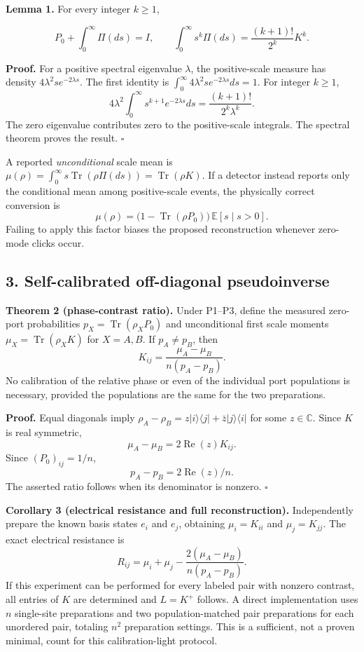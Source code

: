 \documentclass[
  10pt,
  a4paper,
]{article}
\begin{document}
\textbf{Lemma 1.} For every integer \(k\geq1\),

\[
P_0+\int_0^\infty\Pi(ds)=I,\qquad
\int_0^\infty s^k\Pi(ds)=\frac{(k+1)!}{2^k}K^k.
\]

\textbf{Proof.} For a positive spectral eigenvalue \(\lambda\), the positive-scale measure has density \(4\lambda^2s e^{-2\lambda s}\). The first identity is \(\int_0^\infty4\lambda^2s e^{-2\lambda s}ds=1\). For integer \(k\geq1\), \[
4\lambda^2\int_0^\infty s^{k+1}e^{-2\lambda s}ds
=\frac{(k+1)!}{2^k\lambda^k}.
\] The zero eigenvalue contributes zero to the positive-scale integrals. The spectral theorem proves the result. \(\square\)

A reported \emph{unconditional} scale mean is \(\mu(\rho)=\int_0^\infty s\operatorname{Tr}(\rho\Pi(ds))=\operatorname{Tr}(\rho K)\). If a detector instead reports only the conditional mean among positive-scale events, the physically correct conversion is \[
\mu(\rho)=\bigl(1-\operatorname{Tr}(\rho P_0)\bigr)\,\mathbb E[s\mid s>0].
\] Failing to apply this factor biases the proposed reconstruction whenever zero-mode clicks occur.

\subsection{3. Self-calibrated off-diagonal pseudoinverse}\label{self-calibrated-off-diagonal-pseudoinverse}

\textbf{Theorem 2 (phase-contrast ratio).} Under P1--P3, define the measured zero-port probabilities \(p_X=\operatorname{Tr}(\rho_XP_0)\) and unconditional first scale moments \(\mu_X=\operatorname{Tr}(\rho_XK)\) for \(X=A,B\). If \(p_A\ne p_B\), then \[
\boxed{K_{ij}=\frac{\mu_A-\mu_B}{n(p_A-p_B)}.}
\] No calibration of the relative phase or even of the individual port populations is necessary, provided the populations are the same for the two preparations.

\textbf{Proof.} Equal diagonals imply \(\rho_A-\rho_B=z|i\rangle\langle j|+\bar z|j\rangle\langle i|\) for some \(z\in\mathbb C\). Since \(K\) is real symmetric, \[
\mu_A-\mu_B=2\operatorname{Re}(z)K_{ij}.
\] Since \((P_0)_{ij}=1/n\), \[
p_A-p_B=2\operatorname{Re}(z)/n.
\] The asserted ratio follows when its denominator is nonzero. \(\square\)

\textbf{Corollary 3 (electrical resistance and full reconstruction).} Independently prepare the known basis states \(e_i\) and \(e_j\), obtaining \(\mu_i=K_{ii}\) and \(\mu_j=K_{jj}\). The exact electrical resistance is \[
\boxed{R_{ij}=\mu_i+\mu_j-\frac{2(\mu_A-\mu_B)}{n(p_A-p_B)}.}
\] If this experiment can be performed for every labeled pair with nonzero contrast, all entries of \(K\) are determined and \(L=K^+\) follows. A direct implementation uses \(n\) single-site preparations and two population-matched pair preparations for each unordered pair, totaling \(n^2\) preparation settings. This is a sufficient, not a proven minimal, count for this calibration-light protocol.
\end{document}

